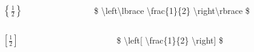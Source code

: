 \begin{frame}
\medskip

\begin{columns}
\begin{column}{.2\textwidth}
\centering
$ \left\lbrace  \frac{1}{2} \right\rbrace $
\end{column}
\begin{column}{.8\textwidth}
{\ttfamily \color{unibayellowI} \$ \color{nounibaredI}\textbackslash left\textbackslash lbrace  \textbackslash frac\color{black}\{1\}\{2\} \color{nounibaredI}\textbackslash right\textbackslash rbrace \color{unibayellowI} \$ }
\end{column}
\end{columns}

\medskip





\begin{columns}
\begin{column}{.2\textwidth}
\centering
$ \left[ \frac{1}{2} \right] $
\end{column}
\begin{column}{.8\textwidth}
{\ttfamily \color{unibayellowI} \$ \color{nounibaredI}\textbackslash left\color{black}[ \color{nounibaredI}\textbackslash frac\color{black}\{1\}\{2\} \color{nounibaredI}\textbackslash right\color{black}] \color{unibayellowI} \$ }
\end{column}
\end{columns}




\end{frame}


